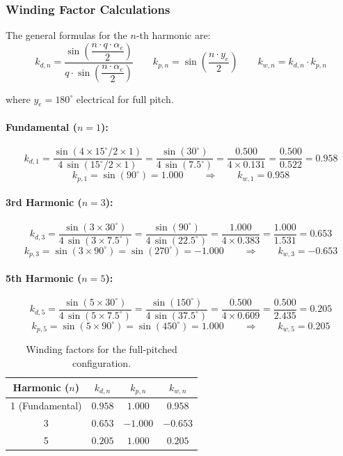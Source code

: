 \documentclass[12pt, a4paper]{article}
\begin{document}
\subsubsection{Winding Factor Calculations}

The general formulas for the $n$-th harmonic are:
\[
    k_{d,n} = \frac{\sin\!\left(\dfrac{n \cdot q \cdot \alpha_e}{2}\right)}{q \cdot \sin\!\left(\dfrac{n \cdot \alpha_e}{2}\right)}
    \qquad
    k_{p,n} = \sin\!\left(\frac{n \cdot y_e}{2}\right)
    \qquad
    k_{w,n} = k_{d,n} \cdot k_{p,n}
\]

where $y_e = 180^\circ$ electrical for full pitch.

\paragraph{Fundamental ($n = 1$):}
\[
    k_{d,1} = \frac{\sin(4 \times 15^\circ / 2 \times 1)}{4\,\sin(15^\circ/2 \times 1)}
            = \frac{\sin(30^\circ)}{4\,\sin(7.5^\circ)}
            = \frac{0.500}{4 \times 0.131} = \frac{0.500}{0.522} = 0.958
\]
\[
    k_{p,1} = \sin(90^\circ) = 1.000 \qquad \Rightarrow \qquad k_{w,1} = 0.958
\]

\paragraph{3rd Harmonic ($n = 3$):}
\[
    k_{d,3} = \frac{\sin(3 \times 30^\circ)}{4\,\sin(3 \times 7.5^\circ)}
            = \frac{\sin(90^\circ)}{4\,\sin(22.5^\circ)}
            = \frac{1.000}{4 \times 0.383} = \frac{1.000}{1.531} = 0.653
\]
\[
    k_{p,3} = \sin(3 \times 90^\circ) = \sin(270^\circ) = -1.000 \qquad \Rightarrow \qquad k_{w,3} = -0.653
\]

\paragraph{5th Harmonic ($n = 5$):}
\[
    k_{d,5} = \frac{\sin(5 \times 30^\circ)}{4\,\sin(5 \times 7.5^\circ)}
            = \frac{\sin(150^\circ)}{4\,\sin(37.5^\circ)}
            = \frac{0.500}{4 \times 0.609} = \frac{0.500}{2.435} = 0.205
\]
\[
    k_{p,5} = \sin(5 \times 90^\circ) = \sin(450^\circ) = 1.000 \qquad \Rightarrow \qquad k_{w,5} = 0.205
\]

\begin{table}[h!]
\centering
\caption{Winding factors for the full-pitched configuration.}
\begin{tabular}{cccc}
\toprule
\textbf{Harmonic ($n$)} & \textbf{$k_{d,n}$} & \textbf{$k_{p,n}$} & \textbf{$k_{w,n}$} \\
\midrule
1 (Fundamental) & $0.958$ & $1.000$ & $0.958$ \\
3               & $0.653$ & $-1.000$ & $-0.653$ \\
5               & $0.205$ & $1.000$ & $0.205$ \\
\bottomrule
\end{tabular}
\end{table}
\end{document}
